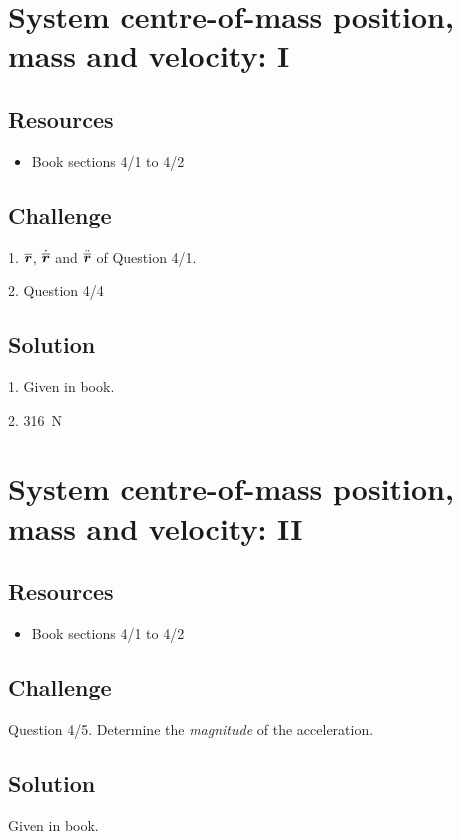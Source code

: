 \newpage
\section{System centre-of-mass position, mass and velocity: I}

\subsection*{Resources}
\begin{itemize}
    \item Book sections 4/1 to 4/2
\end{itemize}

\subsection*{Challenge}
1. $\bm{\overline{r}}$, $\dot{\bm{\overline{r}}}$ and $\ddot{\bm{\overline{r}}}$ of Question 4/1.

2. Question 4/4

\subsection*{Solution}
1. Given in book.

2. \SI{316}{N}




\newpage
\section{System centre-of-mass position, mass and velocity: II}

\subsection*{Resources}
\begin{itemize}
    \item Book sections 4/1 to 4/2
\end{itemize}

\subsection*{Challenge}
Question 4/5. Determine the \emph{magnitude} of the acceleration.

\subsection*{Solution}
Given in book.




